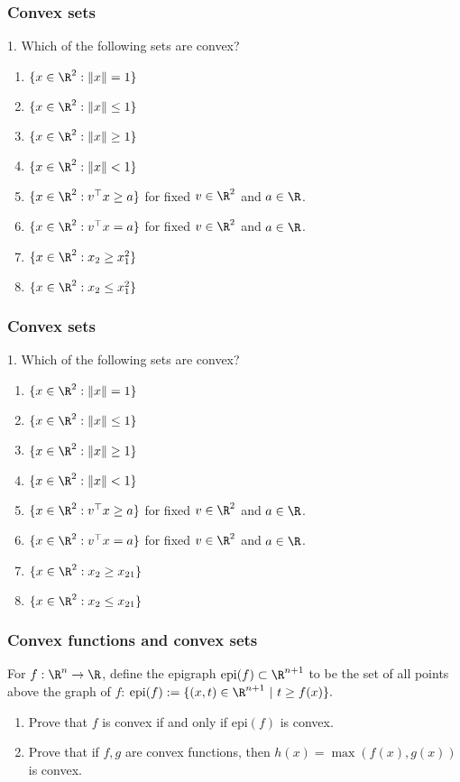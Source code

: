 \documentclass{beamer}
\begin{document}
\begin{frame}[t] 
\frametitle{Convex sets}
\vspace{-10pt}
1. Which of the following sets are convex?
\begin{enumerate}
\item $\{x \in \R^2 : \|x\|=1\}$ 
\item $\{x \in \R^2 : \|x\| \leq 1\}$ 
\item $\{x \in \R^2 : \|x\| \geq 1\}$ 
\item $\{x \in \R^2 : \|x\| < 1\}$ 
\item $\{x \in \R^2 : v^\top x \geq a\}$  for fixed $v \in \R^2$ and $a \in \R$.  
\item $\{x \in \R^2 : v^\top x = a\}$  for fixed $v \in \R^2$ and $a \in \R$.  
\item $\{x \in \R^2 : x_2 \geq x_{1}^2 \}$ 
\item $\{x \in \R^2 : x_2 \leq x_{1}^2 \}$
\end{enumerate}
\pause
\pause
\pause
\end{frame}

\begin{frame}[t] 
\frametitle{Convex sets}
\vspace{-10pt}
1. Which of the following sets are convex?
\begin{enumerate}
\item $\{x \in \R^2 : \|x\|=1\}$ 
\item $\{x \in \R^2 : \|x\| \leq 1\}$ 
\item $\{x \in \R^2 : \|x\| \geq 1\}$ 
\item $\{x \in \R^2 : \|x\| < 1\}$ 
\item $\{x \in \R^2 : v^\top x \geq a\}$  for fixed $v \in \R^2$ and $a \in \R$.  
\item $\{x \in \R^2 : v^\top x = a\}$  for fixed $v \in \R^2$ and $a \in \R$.  
\item $\{x \in \R^2 : x_2 \geq x_{21} \}$ 
\item $\{x \in \R^2 : x_2 \leq x_{21} \}$
\end{enumerate}
\pause
\pause
\pause
\end{frame}

\begin{frame}[t] 
\frametitle{Convex functions and convex sets}
\vspace{-5pt}
For $f : \R^n \rightarrow \R$, define the epigraph $\text{epi}(f) \subset \R^{n+1}$ to be the set of all points above the graph of $f$: $\text{epi}(f) := \{(x,t) \in \R^{n+1} \ | \ t \geq f(x) \}.$
\begin{enumerate}
\item Prove that $f$ is convex if and only if $\text{epi}(f)$ is convex.
\item Prove that if $f,g$ are convex functions, then $h(x) =\max(f(x),g(x))$ is convex.
\end{enumerate}
\pause
\pause
\pause
\end{frame}
\end{document}
